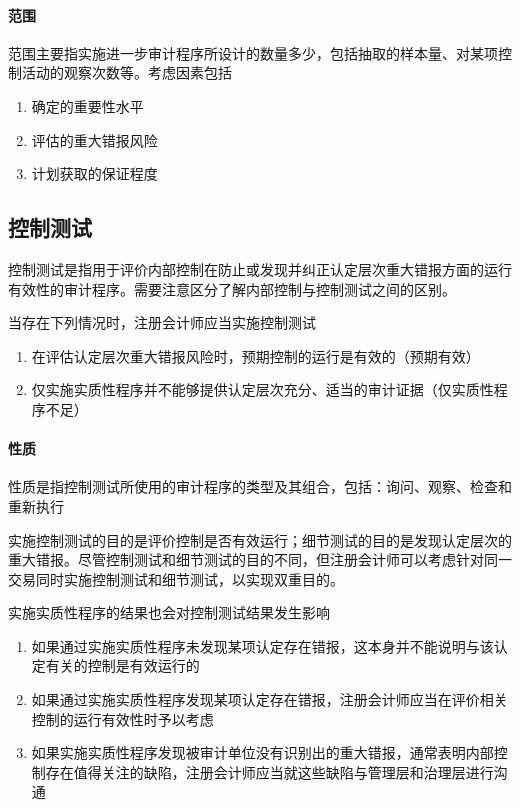 \documentclass[UTF8,12pt]{ctexart}
\numberwithin{equation}{section} %
\numberwithin{figure}{section}
\numberwithin{table}{section}
\begin{document}
	\paragraph{范围}
	范围主要指实施进一步审计程序所设计的数量多少，包括抽取的样本量、对某项控制活动的观察次数等。考虑因素包括
	\begin{enumerate}
		\item 确定的重要性水平
		
		\item 评估的重大错报风险
		
		\item 计划获取的保证程度
	\end{enumerate}
	
	\subsection{控制测试}
	控制测试是指用于评价内部控制在防止或发现并纠正认定层次重大错报方面的运行有效性的审计程序。需要注意区分了解内部控制与控制测试之间的区别。
	
	当存在下列情况时，注册会计师应当实施控制测试
	\begin{enumerate}
		\item 在评估认定层次重大错报风险时，预期控制的运行是有效的（预期有效）
		
		\item 仅实施实质性程序并不能够提供认定层次充分、适当的审计证据（仅实质性程序不足）
	\end{enumerate}
	
	\paragraph{性质}
	性质是指控制测试所使用的审计程序的类型及其组合，包括：询问、观察、检查和重新执行
	
	实施控制测试的目的是评价控制是否有效运行；细节测试的目的是发现认定层次的重大错报。尽管控制测试和细节测试的目的不同，但注册会计师可以考虑针对同一交易同时实施控制测试和细节测试，以实现双重目的。
	
	实施实质性程序的结果也会对控制测试结果发生影响
	\begin{enumerate}
		\item 如果通过实施实质性程序未发现某项认定存在错报，这本身并不能说明与该认定有关的控制是有效运行的
		
		\item 如果通过实施实质性程序发现某项认定存在错报，注册会计师应当在评价相关控制的运行有效性时予以考虑
		
		\item 如果实施实质性程序发现被审计单位没有识别出的重大错报，通常表明内部控制存在值得关注的缺陷，注册会计师应当就这些缺陷与管理层和治理层进行沟通
	\end{enumerate}
	
\end{document}
